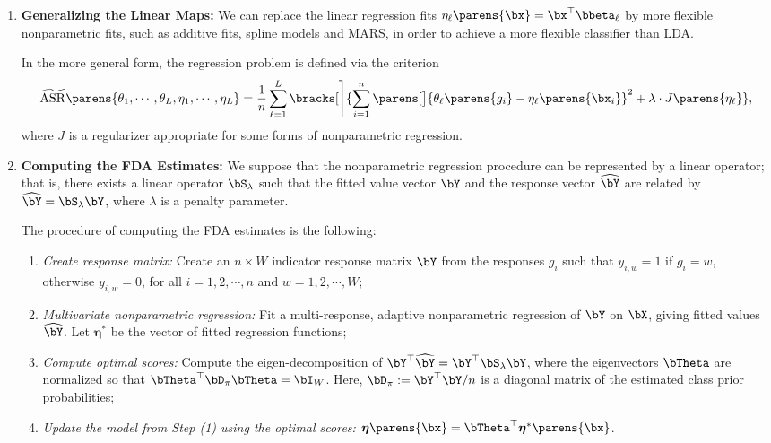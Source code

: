 \documentclass[12pt]{article}
\begin{document}
\begin{enumerate}[label=\textbf{\arabic*.}]
	\item \textbf{Generalizing the Linear Maps:} We can replace the linear regression fits $\eta_{\ell} \parens{\bx} = \bx^\top \bbeta_{\ell}$ by more flexible nonparametric fits, such as additive fits, spline models and MARS, in order to achieve a more flexible classifier than LDA. 
	
	In the more general form, the regression problem is defined via the criterion 
	\begin{align}\label{eq-fda}
		\widetilde{\mathrm{ASR}} \parens{\theta_1, \cdots, \theta_L, \eta_1, \cdots, \eta_L} = \frac{1}{n} \sum_{\ell=1}^L \bracks[\Bigg]{\sum_{i=1}^n \parens[\big]{\theta_{\ell} \parens{g_i} - \eta_{\ell} \parens{\bx_i}}^2 + \lambda \cdot J \parens{\eta_{\ell}}}, 
	\end{align} 
	where $J$ is a regularizer appropriate for some forms of nonparametric regression. 
	
	\item \textbf{Computing the FDA Estimates:} We suppose that the nonparametric regression procedure can be represented by a linear operator; that is, there exists a linear operator $\bS_{\lambda}$ such that the fitted value vector $\bY$ and the response vector $\widehat{\bY}$ are related by $\widehat{\bY} = \bS_{\lambda} \bY$, where $\lambda$ is a penalty parameter. 
	
	The procedure of computing the FDA estimates is the following: 
	\begin{enumerate}[label=(\arabic*)]
		\item \textit{Create response matrix:} Create an $n \times W$ indicator response matrix $\bY$ from the responses $g_i$ such that $y_{i, w} = 1$ if $g_i = w$, otherwise $y_{i, w} = 0$, for all $i = 1, 2, \cdots, n$ and $w = 1, 2, \cdots, W$; 
		\item \textit{Multivariate nonparametric regression:} Fit a multi-response, adaptive nonparametric regression of $\bY$ on $\bX$, giving fitted values $\widehat{\bY}$. Let $\boldsymbol{\eta}^*$ be the vector of fitted regression functions; 
		\item \textit{Compute optimal scores:} Compute the eigen-decomposition of $\bY^\top \widehat{\bY} = \bY^\top \bS_{\lambda} \bY$, where the eigenvectors $\bTheta$ are normalized so that $\bTheta^\top \bD_{\pi} \bTheta = \bI_W$. Here, $\bD_{\pi} := \bY^\top \bY/n$ is a diagonal matrix of the estimated class prior probabilities; 
		\item \textit{Update the model from Step (1) using the optimal scores:} $\boldsymbol{\eta} \parens{\bx} = \bTheta^\top \boldsymbol{\eta}^* \parens{\bx}$. 
	\end{enumerate}
\end{enumerate}
\end{document}
